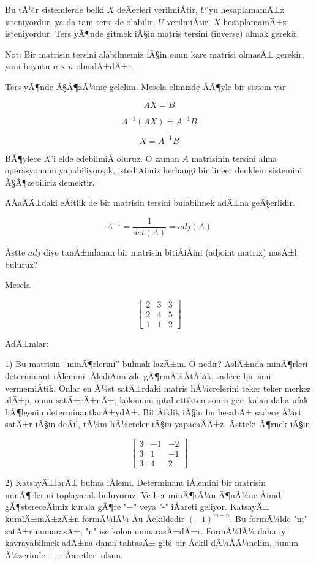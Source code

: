 \documentclass[12pt,fleqn]{article}\usepackage{../../common}
\begin{document}
Bu tÃ¼r sistemlerde belki $X$ deÄerleri verilmiÅtir, $U$'yu hesaplamamÄ±z
isteniyordur, ya da tam tersi de olabilir, $U$ verilmiÅtir, $X$
hesaplamamÄ±z isteniyordur. Ters yÃ¶nde gitmek iÃ§in matris tersini (inverse)
almak gerekir.

Not: Bir matrisin tersini alabilmemiz iÃ§in onun kare matrisi olmasÄ± gerekir,
yani boyutu $n$ x $n$ olmalÄ±dÄ±r. 

Ters yÃ¶nde Ã§Ã¶zÃ¼me gelelim. Mesela elimizde ÅÃ¶yle bir sistem var

$$  AX = B$$

$$  A^{-1}(AX) = A^{-1}B$$

$$  X = A^{-1}B$$

BÃ¶ylece $X$'i elde edebilmiÅ oluruz. O zaman $A$ matrisinin tersini alma
operasyonunu yapabiliyorsak, istediÄimiz herhangi bir lineer denklem
sistemini Ã§Ã¶zebiliriz demektir. 

AÅaÄÄ±daki eÅitlik de bir matrisin tersini bulabilmek adÄ±na geÃ§erlidir. 

$$ A^{-1} = \frac{1}{det(A)}  = adj(A)$$

Ãstte $adj$ diye tanÄ±mlanan bir matrisin bitiÅiÄini (adjoint matrix) nasÄ±l
buluruz?

Mesela

$$ 
\left[\begin{array}{rrr}
2 & 3 & 3 \\
2 & 4 & 5 \\
1 & 1 & 2
\end{array}\right]
 $$

AdÄ±mlar:

1) Bu matrisin ``minÃ¶rlerini'' bulmak lazÄ±m. O nedir? AslÄ±nda minÃ¶rleri
determinant iÅlemini iÅlediÄimizde gÃ¶rmÃ¼ÅtÃ¼k, sadece bu ismi vermemiÅtik.
Onlar en Ã¼st satÄ±rdaki matris hÃ¼crelerini teker teker merkez alÄ±p, onun
satÄ±rÄ±nÄ±, kolonunu iptal ettikten sonra geri kalan daha ufak bÃ¶lgenin
determinantlarÄ±ydÄ±. BitiÅiklik iÃ§in bu hesabÄ± sadece Ã¼st satÄ±r iÃ§in deÄil,
tÃ¼m hÃ¼creler iÃ§in yapacaÄÄ±z. Ãstteki Ã¶rnek iÃ§in

$$ 
\left[\begin{array}{rrr}
3 & -1 & -2 \\
3 & 1 & -1 \\
3 & 4 & 2
\end{array}\right]
 $$




2) KatsayÄ±larÄ± bulma iÅlemi. Determinant iÅlemini bir matrisin minÃ¶rlerini 
toplayarak buluyoruz. Ve her minÃ¶rÃ¼n Ã¶nÃ¼ne Åimdi gÃ¶stereceÄimiz kurala gÃ¶re "+" 
veya "-" iÅareti geliyor. KatsayÄ± kuralÄ±mÄ±zÄ±n formÃ¼lÃ¼ Åu Åekildedir 
$(-1)^{m+n}$. Bu formÃ¼lde "m" satÄ±r numarasÄ±, "n" ise kolon numarasÄ±dÄ±r. FormÃ¼lÃ¼ 
daha iyi kavrayabilmek adÄ±na dama tahtasÄ± gibi bir Åekil dÃ¼ÅÃ¼nelim, bunun
Ã¼zerinde +,- iÅaretleri olsun. 
\end{document}

